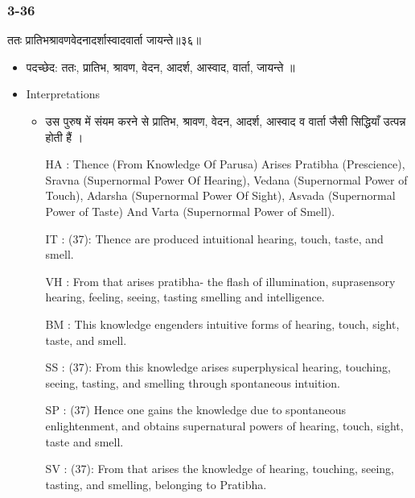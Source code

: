 \begin{frame}[fragile]\frametitle{3-36}
\begin{sanskrit}
ततः प्रातिभश्रावणवेदनादर्शास्वादवार्ता जायन्ते॥३६॥
\end{sanskrit}

	\begin{itemize}
	\item पदच्छेद:  ततः, प्रातिभ, श्रावण, वेदन, आदर्श, आस्वाद, वार्ता, जायन्ते ॥
	\item Interpretations
		\begin{itemize}	
		\item उस पुरुष में संयम करने से प्रातिभ, श्रावण, वेदन, आदर्श, आस्वाद व वार्ता जैसी सिद्धियाँ उत्पन्न होती हैं ।
		\item [HA]: Thence (From Knowledge Of Parusa) Arises Pratibha (Prescience), Sravna (Supernormal Power Of Hearing), Vedana (Supernormal Power of Touch), Adarsha (Supernormal Power Of Sight), Asvada (Supernormal Power of Taste) And Varta (Supernormal Power of Smell).
		\item [IT]: (37): Thence are produced intuitional hearing, touch, taste, and smell.
		\item [VH]: From that arises pratibha- the flash of illumination, suprasensory hearing, feeling, seeing, tasting smelling and intelligence.
		\item [BM]: This knowledge engenders intuitive forms of hearing, touch, sight, taste, and smell.
		\item [SS]: (37): From this knowledge arises superphysical hearing, touching, seeing, tasting, and smelling through spontaneous intuition.
		\item [SP]: (37) Hence one gains the knowledge due to spontaneous enlightenment, and obtains supernatural powers of hearing, touch, sight, taste and smell.
		\item [SV]: (37): From that arises the knowledge of hearing, touching, seeing, tasting, and smelling, belonging to Pratibha. 
		\end{itemize}
	\end{itemize}
\end{frame}

